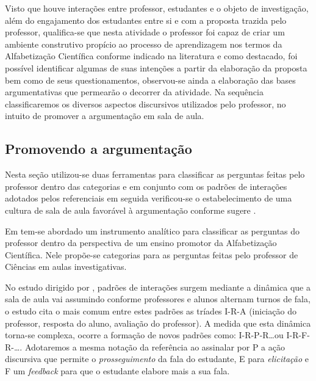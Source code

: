 Visto que houve interações entre professor, estudantes e o objeto de investigação, além do engajamento dos estudantes entre si e com a proposta trazida pelo professor, qualifica-se que nesta atividade o professor foi capaz de criar um ambiente construtivo propício ao processo de aprendizagem nos termos da Alfabetização Científica conforme indicado na literatura e como destacado, foi possível identificar algumas de suas intenções a partir da elaboração da proposta bem como de seus questionamentos, observou-se ainda a elaboração das bases argumentativas que permearão o decorrer da atividade. Na sequência classificaremos os diversos aspectos discursivos utilizados pelo professor, no intuito de promover a argumentação em sala de aula.


\subsection{Promovendo a argumentação}
\label{subsec: transcPromoArg}
Nesta seção utilizou-se duas ferramentas para classificar as perguntas feitas pelo professor dentro das categorias e em conjunto com os padrões de interações adotados pelos referenciais em seguida verificou-se o estabelecimento de uma cultura de sala de aula favorável à argumentação conforme sugere \cite{TELES:2021}.

Em \cite{SASSERON:2012} tem-se abordado um instrumento analítico para classificar as perguntas do professor dentro da perspectiva de um ensino promotor da Alfabetização Científica. Nele propõe-se categorias para as perguntas feitas pelo professor de Ciências em aulas investigativas.

No estudo dirigido por \cite{MORTIMER:2002}, padrões de interações surgem mediante a dinâmica que a sala de aula vai assumindo conforme professores e alunos alternam turnos de fala, o estudo cita o mais comum entre estes padrões as tríades I-R-A (iniciação do professor, resposta do aluno, avaliação do professor). A medida que esta dinâmica torna-se complexa, ocorre a formação de novos padrões como: I-R-P-R\ldots ou I-R-F-R-\ldots. Adotaremos a mesma notação da referência ao assinalar por P a ação discursiva que permite o \emph{prosseguimento} da fala do estudante, E para \emph{elicitação} e F um \emph{feedback} para que o estudante elabore mais a sua fala.

